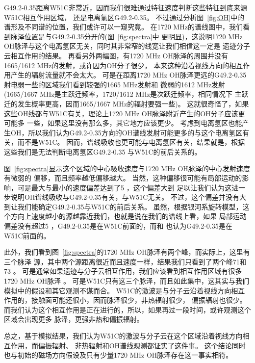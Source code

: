 G49.2-0.35距离W51C非常近，因而我们很难通过特征速度判断这些特征到底来源W51C相互作用区域，
还是电离氢区G49.2-0.35。
不过通过分析图~\ref{fig:OH}中的谱形及不同谱的位置，我们或许可以一窥究竟。
在1720 MHz的谱线图中，我们看到脉泽位置是与G49.2-0.35分开的(图~\ref{fig:spectra}中
更明显)，这说明1720 MHz OH脉泽与这个电离氢区无关，同时其非常窄的线宽让我们相信这一定是
遗迹分子云相互作用的结果。
再看另外两幅图，有1720 MHz OH脉泽的周围并没有1665/1612 MHz的发射，或许因为OH分子很少，
本来这种沿着视线方向的相互作用产生的辐射流量就不会太大。
可是在距离1720 MHz OH脉泽更远的G49.2-0.35射电弱一些的区域我们看到较强的1665 MHz发射和
微弱的1612 MHz发射(1665/1667 MHz是主跃迁频率，1720/1612 MHz是次跃迁频率，相同情况下
主跃迁的发生概率更高，因而1665/1667 MHz的辐射要强一些)。
这就很奇怪了，如果这些OH线都与W51C有关，理论上1720 MHz OH脉泽附近产生的OH分子应该更可能多
一些，如果这里没有那么多，其它地方应该更少。
考虑到电离氢区也能产生OH，所以我们认为G49.2-0.35方向的OH谱线发射可能更多的与这个电离氢区有
关，而不是W51C。
因而，谱线吸收也更可能与电离氢区有关，结果就是，根据这些我们是无法判断电离氢区G49.2-0.35
与W51C的前后关系的。

图~\ref{fig:spectra}显示这个区域的中心吸收速度与1720 MHz OH脉泽的中心发射速度有微弱的
偏移，而且频率越低偏移越大。
当然，这种偏移很可能有局部运动的影响，可是最大与最小的速度偏差达到了5 \kms，这个偏差大到
足以让我们认为这进一步说明OH谱线吸收与G49.2-0.35有关，与W51C无关。
不过，这个偏差并没有大到让我们能确定G49.2-0.35与W51C的前后关系。
虽然，根据银河系旋转模型，这个方向上速度越小的源越靠近我们，也就是说在我们的谱线上看，如果
局部运动偏差没有超过5 \kms，G49.2-0.35是在W51C前面的，而\citet{Brogan2013}和
\citet{Ginsburg2015}也认为G49.2-0.35是在W51C前面的。

此外，我们看到图~\ref{fig:spectra}的1720 MHz OH脉泽有两个峰，而实际上，这里有三个脉泽
源，其中两个源距离很近而且速度一样\citep{Brogan2013}，结果我们只看到了两个峰71和73 \kms。
可是通常如果遗迹与分子云相互作用，我们应该看到相互作用区域有很多1720 MHz OH脉泽
\citep{2012IAUS..287..441W}。
可是W51C只有这三个脉泽，而且如此集中，这其实与我们模拟中的假设和其它观测不谋而合。
W51C的激波是与分子云沿着视线方向相互作用的，接触面可能还很小，因而脉泽很少，非热辐射很少，
偏振辐射也很少。
而我们认为这个相互作用是正在进行的，所以，如果再过一段时间，或许观测这个区域会出现更多
脉泽，更强非热和偏振辐射。

总之，基于模拟结果，我们认为W51C的激波与分子云在这个区域沿着视线方向相互作用，而偏振辐射、
非热辐射和OH谱线观测都证实了这件事。
这个结论同时也与初始的磁场方向假设及只有少量1720 MHz OH脉泽存在这一事实相符。

